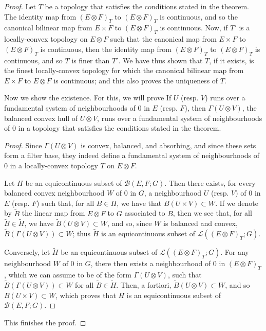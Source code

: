 \documentclass{article}
\theoremstyle{plain}
\newenvironment{proposition}[1]
    {\renewcommand\theinnercustomproposition{#1}\innercustomproposition}
    {\endinnercustomproposition}
\theoremstyle{definition}
\newcommand{\BB}{\mathcal{B}}
\newcommand{\LL}{\mathcal{L}}
\newcommand{\oldpage}[1]{\marginpar{\footnotesize$\Big\vert$ \textit{p.~#1}}}
\begin{document}
\begin{proof}
  Let $T$ be a topology that satisfies the conditions stated in the theorem.
  The identity map from $(E\otimes F)_T$ to $(E\otimes F)_T$ is continuous, and so the canonical bilinear map from $E\times F$ to $(E\otimes F)_T$ is continuous.
  Now, if $T'$ is a locally-convex topology on $E\otimes F$ such that the canonical map from $E\times F$ to $(E\otimes F)_T$ is continuous, then the identity map from $(E\otimes F)_T$ to $(E\otimes F)_T$ is continuous, and so $T$ is finer than $T'$.
  We have thus shown that $T$, if it exists, is the finest locally-convex topology for which the canonical bilinear map from $E\times F$ to $E\otimes F$ is continuous;
  and this also proves the uniqueness of $T$.

  Now we show the existence.
\oldpage{2}
  For this, we will prove
  \begin{proposition}{1}
    If $U$ (resp. $V$) runs over a fundamental system of neighbourhoods of $0$ in $E$ (resp. $F$), then $\Gamma(U\otimes V)$, the balanced convex hull of $U\otimes V$, runs over a fundamental system of neighbourhoods of $0$ in a topology that satisfies the conditions stated in the theorem.
  \end{proposition}

  \begin{proof}
    Since $\Gamma(U\otimes V)$ is convex, balanced, and absorbing, and since these sets form a filter base, they indeed define a fundamental system of neighbourhoods of $0$ in a locally-convex topology $T$ on $E\otimes F$.

    Let $H$ be an equicontinuous subset of $\BB(E,F;G)$.
    Then there exists, for every balanced convex neighbourhood $W$ of $0$ in $G$, a neighbourhood $U$ (resp. $V$) of $0$ in $E$ (resp. $F$) such that, for all $B\in H$, we have that $B(U\times V)\subset W$.
    If we denote by $\widetilde{B}$ the linear map from $E\otimes F$ to $G$ associated to $B$, then we see that, for all $\widetilde{B}\in\widetilde{H}$, we have $\widetilde{B}(U\otimes V)\subset W$, and so, since $W$ is balanced and convex, $\widetilde{B}(\Gamma(U\otimes V))\subset W$;
    thus $\widetilde{H}$ is an equicontinuous subset of $\LL((E\otimes F)_T;G)$.

    Conversely, let $\widetilde{H}$ be an equicontinuous subset of $\LL((E\otimes F)_T;G)$.
    For any neighbourhood $W$ of $0$ in $G$, there then exists a neighbourhood of $0$ in $(E\otimes F)_T$, which we can assume to be of the form $\Gamma(U\otimes V)$, such that $\widetilde{B}(\Gamma(U\otimes V))\subset W$ for all $\widetilde{B}\in\widetilde{H}$.
    Then, a fortiori, $\widetilde{B}(U\otimes V)\subset W$, and so $B(U\times V)\subset W$, which proves that $H$ is an equicontinuous subset of $\BB(E,F;G)$.
  \end{proof}
  This finishes the proof.
\end{proof}
\end{document}
